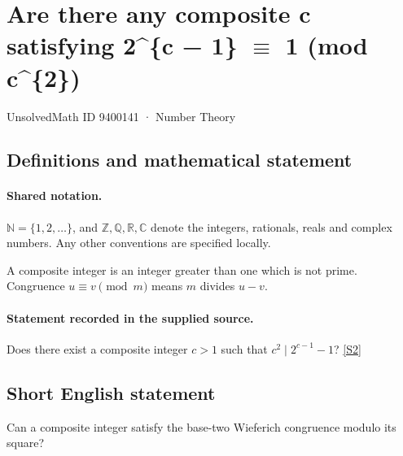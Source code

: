 \documentclass[11pt]{article}
\newcommand{\sref}[2]{\hyperlink{source:#1:#2}{[S#2]}}
\begin{document}
\setcounter{section}{9400140}
\section{\texorpdfstring{Are there any composite c satisfying 2\textasciicircum{}\{c − 1\} $\equiv$ 1 (mod c\textasciicircum{}\{2\})}{Are there any composite c satisfying 2\textasciicircum{}\{c − 1\} congruent to 1 (mod c\textasciicircum{}\{2\})}}\label{9400141}
{\small\sffamily UnsolvedMath ID 9400141 · Number Theory}
\subsection{Definitions and mathematical statement}

\paragraph{Shared notation.}$\mathbb N=\{1,2,\ldots\}$, and $\mathbb Z,\mathbb Q,\mathbb R,\mathbb C$ denote the integers, rationals, reals and complex numbers. Any other conventions are specified locally.


A composite integer is an integer greater than one which is not prime. Congruence $u\equiv v\pmod m$ means $m$ divides $u-v$.
\paragraph{Statement recorded in the supplied source.}
Does there exist a composite integer $c>1$ such that $c^2\mid2^{c-1}-1$? \sref{9400141}{2}
\subsection{Short English statement}
Can a composite integer satisfy the base-two Wieferich congruence modulo its square?
\end{document}
